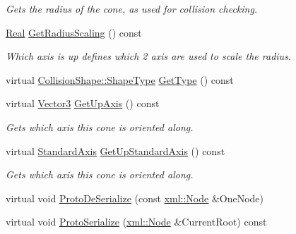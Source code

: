 \begin{DoxyCompactItemize}
\begin{DoxyCompactList}\small\item\em Gets the radius of the cone, as used for collision checking. \item\end{DoxyCompactList}\item 
\hyperlink{namespaceMezzanine_a726731b1a7df72bf3583e4a97282c6f6}{Real} \hyperlink{classMezzanine_1_1ConeCollisionShape_a6588a43aa775e0f33bc7d9741699fd3f}{GetRadiusScaling} () const 
\begin{DoxyCompactList}\small\item\em Which axis is up defines which 2 axis are used to scale the radius. \item\end{DoxyCompactList}\item 
virtual \hyperlink{classMezzanine_1_1CollisionShape_ad04186055565998879b64176d6dd100d}{CollisionShape::ShapeType} \hyperlink{classMezzanine_1_1ConeCollisionShape_a874892f3aaba7e79200633691037a410}{GetType} () const 
\item 
virtual \hyperlink{classMezzanine_1_1Vector3}{Vector3} \hyperlink{classMezzanine_1_1ConeCollisionShape_aed9f36553311ca8d20ccd0d7a01ec4ee}{GetUpAxis} () const 
\begin{DoxyCompactList}\small\item\em Gets which axis this cone is oriented along. \item\end{DoxyCompactList}\item 
virtual \hyperlink{namespaceMezzanine_ab41a00a8c6a47b576dc987ec34e16ba1}{StandardAxis} \hyperlink{classMezzanine_1_1ConeCollisionShape_aa17fc2f15ba313109ff40f1a66e088be}{GetUpStandardAxis} () const 
\begin{DoxyCompactList}\small\item\em Gets which axis this cone is oriented along. \item\end{DoxyCompactList}\item 
virtual void \hyperlink{classMezzanine_1_1ConeCollisionShape_a5a47688b99093433fd2e9cb11dff9535}{ProtoDeSerialize} (const \hyperlink{classMezzanine_1_1xml_1_1Node}{xml::Node} \&OneNode)
\item 
virtual void \hyperlink{classMezzanine_1_1ConeCollisionShape_a881cc9722b623c3c5e5a64bbc01a45c8}{ProtoSerialize} (\hyperlink{classMezzanine_1_1xml_1_1Node}{xml::Node} \&CurrentRoot) const 
\end{DoxyCompactItemize}
